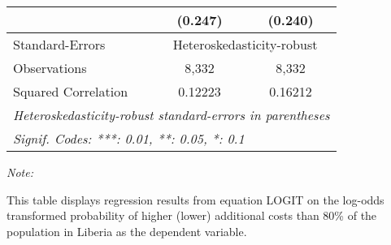 \begin{table}[htbp!]
\begin{adjustbox}{width = 1\textwidth, max height = 0.95\textheight, center}
\begin{threeparttable}[b]
\begin{tabular}{lcc}
                                 & (0.247)        & (0.240)\\   
            \midrule 
            Standard-Errors & \multicolumn{2}{c}{Heteroskedasticity-robust} \\ 
            Observations         & 8,332          & 8,332\\  
            Squared Correlation  & 0.12223        & 0.16212\\  
            \midrule \midrule
            \multicolumn{3}{l}{\emph{Heteroskedasticity-robust standard-errors in parentheses}}\\
            \multicolumn{3}{l}{\emph{Signif. Codes: ***: 0.01, **: 0.05, *: 0.1}}\\
         \end{tabular}
         
         \begin{tablenotes}\item \medskip \textit{Note:}
            \item This table displays regression results from equation LOGIT on the log-odds transformed probability of higher (lower) additional costs than 80\% of the population in Liberia as the dependent variable. 
         \end{tablenotes}
      \end{threeparttable}
   \end{adjustbox}
\end{table}


